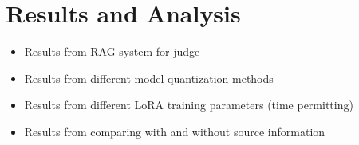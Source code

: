 \section{Results and Analysis}

\begin{itemize}
    \item Results from RAG system for judge
    \item Results from different model quantization methods
    \item Results from different LoRA training parameters (time permitting)
    \item Results from comparing with and without source information
\end{itemize}